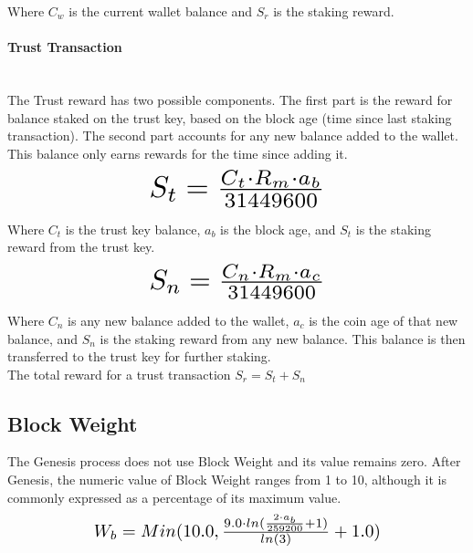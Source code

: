 \documentclass[11pt]{article}
\begin{document}
\noindent Where $C_{w}$ is the current wallet balance and $S_{r}$ is the staking reward.

\paragraph{Trust Transaction} ~\\
The Trust reward has two possible components. The first part is the reward for balance staked on the trust key, based on the block age (time since last staking transaction). The second part accounts for any new balance added to the wallet. This balance only earns rewards for the time since adding it.\\

\begin{equation}
\resizebox{.40\hsize}{!}{$S_{t} = \frac{C_{t} \cdot R_{m} \cdot a_{b}}{31449600}$}
\end{equation}

\noindent Where $C_{t}$ is the trust key balance, $a_{b}$ is the block age, and $S_{t}$ is the staking reward from the trust key.\\

\begin{equation}
\resizebox{.40\hsize}{!}{$S_{n} = \frac{C_{n} \cdot R_{m} \cdot a_c}{31449600}$}
\end{equation}

\noindent Where $C_{n}$ is any new balance added to the wallet, $a_c$ is the coin age of that new balance, and $S_{n}$ is the staking reward from any new balance. This balance is then transferred to the trust key for further staking.\\

\noindent The total reward for a trust transaction $S_{r} = S_{t} + S_{n}$\\


\subsection{Block Weight}
The Genesis process does not use Block Weight and its value remains zero. After Genesis, the numeric value of Block Weight ranges from 1 to 10, although it is commonly expressed as a percentage of its maximum value.\\

\begin{equation}
\resizebox{.65\hsize}{!}{$W_{b} = Min(10.0, \frac{9.0 \cdot ln(\frac{2 \cdot a_{b}}{259200} + 1)}{ln(3)} + 1.0)$}
\end{equation}\\
\end{document}
